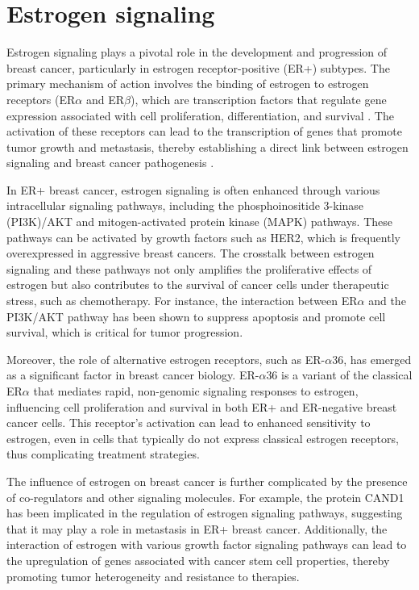 \section{Estrogen signaling}

Estrogen signaling plays a pivotal role in the development and progression of
breast cancer, particularly in estrogen receptor-positive (ER+) subtypes. The
primary mechanism of action involves the binding of estrogen to estrogen
receptors (ER$\alpha$ and ER$\beta$), which are transcription factors that
regulate gene expression associated with cell proliferation, differentiation,
and survival \supercite{misawa_estrogen-related_2015,lattouf_lkb1_2016}. The
activation of these receptors can lead to the transcription of genes that
promote tumor growth and metastasis, thereby establishing a direct link between
estrogen signaling and breast cancer pathogenesis
\supercite{feng_cross-talk_2020}.

In ER+ breast cancer, estrogen signaling is often enhanced through various
intracellular signaling pathways, including the phosphoinositide 3-kinase
(PI3K)/AKT and mitogen-activated protein kinase (MAPK) pathways. These pathways
can be activated by growth factors such as HER2, which is frequently
overexpressed in aggressive breast
cancers\supercite{bratton_regulation_2010,salmeron-hernandez_bcas2_2019}. The
crosstalk between estrogen signaling and these pathways not only amplifies the
proliferative effects of estrogen but also contributes to the survival of cancer
cells under therapeutic stress, such as
chemotherapy\supercite{bratton_regulation_2010,george_hypoxia_2012}. For
instance, the interaction between ER$\alpha$ and the PI3K/AKT pathway has been
shown to suppress apoptosis and promote cell survival, which is critical for
tumor progression\supercite{bratton_regulation_2010,george_hypoxia_2012}.

Moreover, the role of alternative estrogen receptors, such as ER-$\alpha$36, has
emerged as a significant factor in breast cancer biology. ER-$\alpha$36 is a
variant of the classical ER$\alpha$ that mediates rapid, non-genomic signaling
responses to estrogen, influencing cell proliferation and survival in both ER+
and ER-negative breast cancer
cells\supercite{deng_er-36-mediated_2014,zhang_positive_2011}. This receptor's
activation can lead to enhanced sensitivity to estrogen, even in cells that
typically do not express classical estrogen receptors, thus complicating
treatment strategies\supercite{zhang_positive_2011}.

The influence of estrogen on breast cancer is further complicated by the
presence of co-regulators and other signaling molecules. For example, the
protein CAND1 has been implicated in the regulation of estrogen signaling
pathways, suggesting that it may play a role in metastasis in ER+ breast
cancer\supercite{alhammad_bioinformatics_2022}. Additionally, the interaction of
estrogen with various growth factor signaling pathways can lead to the
upregulation of genes associated with cancer stem cell properties, thereby
promoting tumor heterogeneity and resistance to
therapies\supercite{fillmore_estrogen_2010,xue_sox9fxyd3src_2019}.

